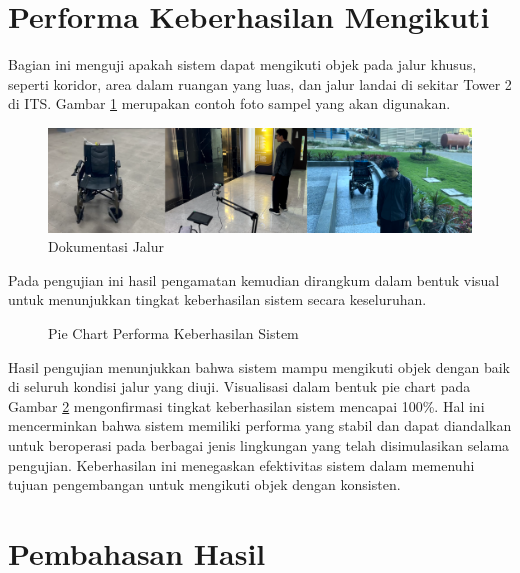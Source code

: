 \section{Performa Keberhasilan Mengikuti}
\label{sec:performamengikuti}

Bagian ini menguji apakah sistem dapat mengikuti objek pada jalur khusus, seperti koridor, area dalam ruangan yang luas, dan jalur landai di sekitar Tower 2 di ITS. Gambar \ref{fig:doc_jalur} merupakan contoh foto sampel yang akan digunakan.

\begin{figure}[H]
    \centering
    \includegraphics[width=1\textwidth]{gambar/sc_all.png}
    \caption{Dokumentasi Jalur}
    \label{fig:doc_jalur}
\end{figure}

Pada pengujian ini hasil pengamatan kemudian dirangkum dalam bentuk visual untuk menunjukkan tingkat keberhasilan sistem secara keseluruhan.

\begin{figure}[H]
    \centering
    \caption{Pie Chart Performa Keberhasilan Sistem}
    \label{fig:piechart}
\end{figure}

Hasil pengujian menunjukkan bahwa sistem mampu mengikuti objek dengan baik di seluruh kondisi jalur yang diuji. Visualisasi dalam bentuk pie chart pada Gambar \ref{fig:piechart} mengonfirmasi tingkat keberhasilan sistem mencapai 100\%. Hal ini mencerminkan bahwa sistem memiliki performa yang stabil dan dapat diandalkan untuk beroperasi pada berbagai jenis lingkungan yang telah disimulasikan selama pengujian. Keberhasilan ini menegaskan efektivitas sistem dalam memenuhi tujuan pengembangan untuk mengikuti objek dengan konsisten.

\section{Pembahasan Hasil}
\label{sec:pembahasanhasil}

